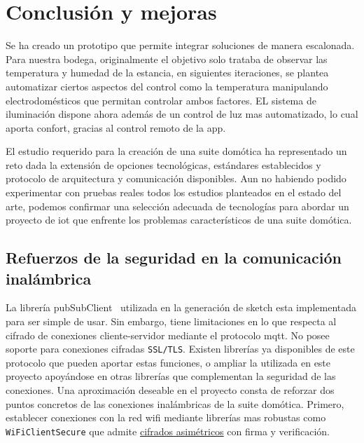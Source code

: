 \cleardoublepage

\chapter{Conclusión y mejoras}
\label{ch:Capitulo6}

Se ha creado un prototipo que permite integrar soluciones de manera escalonada. Para nuestra bodega, originalmente el objetivo solo trataba de observar las temperatura y humedad de la estancia, en siguientes iteraciones, se plantea automatizar ciertos aspectos del control como la temperatura manipulando electrodomésticos que permitan controlar ambos factores. EL sistema de iluminación dispone ahora además de un control de luz mas automatizado, lo cual aporta confort, gracias al control remoto de la \gls{app}.

\vspace{1cm}

El estudio requerido para la creación de una suite domótica ha representado un reto dada la extensión de opciones tecnológicas, estándares establecidos y protocolo de arquitectura y comunicación disponibles. Aun no habiendo podido experimentar con pruebas reales todos los estudios planteados en el estado del arte, podemos confirmar una selección adecuada de tecnologías para abordar un proyecto de \gls{iot} que enfrente los problemas característicos de una suite domótica.


\section{Refuerzos de la seguridad en la comunicación inalámbrica}
\label{ch:Capitulo6.1}
La librería pubSubClient~\cite{pubsubclientapi} utilizada en la generación de \gls{sketch} esta implementada para ser simple de usar. Sin embargo, tiene limitaciones en lo que respecta al cifrado de conexiones cliente-servidor mediante el protocolo \gls{mqtt}. No posee soporte para conexiones cifradas \verb|SSL/TLS|. Existen librerías ya disponibles de este protocolo que pueden aportar estas funciones, o ampliar la utilizada en este proyecto apoyándose en otras librerías que complementan la seguridad de las conexiones. Una aproximación deseable en el proyecto consta de reforzar dos puntos concretos de las conexiones inalámbricas de la suite domótica. Primero, establecer conexiones con la red \gls{wifi} mediante librerías mas robustas como \verb|WiFiClientSecure| que admite \href{https://arduino-esp8266.readthedocs.io/en/latest/esp8266wifi/client-secure-class.html}{cifrados asimétricos} con firma y verificación. 

